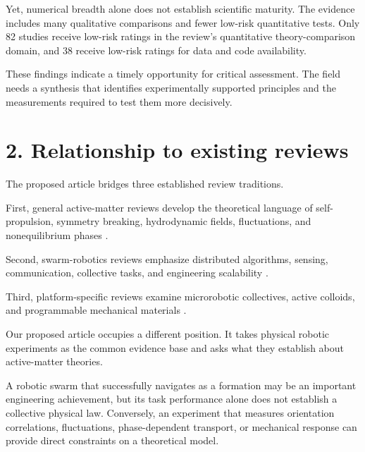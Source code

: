 Yet, numerical breadth alone does not establish
scientific maturity. The evidence includes
many qualitative comparisons and fewer
low-risk quantitative tests. Only 82 studies
receive low-risk ratings in the review's
quantitative theory-comparison domain,
and 38 receive low-risk ratings for
data and code availability.

These findings indicate a timely opportunity
for critical assessment. The field needs
a synthesis that identifies experimentally
supported principles and the measurements
required to test them more decisively.

\section*{2. Relationship to existing reviews}

The proposed article bridges three established
review traditions.

First, general active-matter reviews develop
the theoretical language of self-propulsion,
symmetry breaking, hydrodynamic fields,
fluctuations, and nonequilibrium phases
.

Second, swarm-robotics reviews emphasize
distributed algorithms, sensing, communication,
collective tasks, and engineering scalability
.

Third, platform-specific reviews examine
microrobotic collectives, active colloids,
and programmable mechanical materials
.

Our proposed article occupies a different
position. It takes physical robotic experiments
as the common evidence base and asks what
they establish about active-matter theories.

A robotic swarm that successfully navigates
as a formation may be an important engineering
achievement, but its task performance alone
does not establish a collective physical law.
Conversely, an experiment that measures
orientation correlations, fluctuations,
phase-dependent transport, or mechanical
response can provide direct constraints
on a theoretical model.

